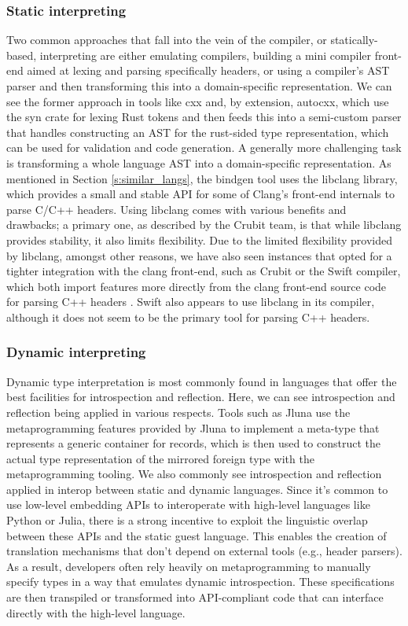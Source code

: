 \subsubsection{Static interpreting}

Two common approaches that fall into the vein of the compiler, or statically-based, interpreting are either emulating compilers, \ie building a mini compiler front-end aimed at lexing and parsing specifically headers, or using a compiler's AST parser and then transforming this into a domain-specific representation. We can see the former approach in tools like cxx and, by extension, autocxx, which use the syn crate \cite{dtolnay_syn} for lexing Rust tokens and then feeds this into a semi-custom parser that handles constructing an AST for the rust-sided type representation, which can be used for validation and code generation. A generally more challenging task is transforming a whole language AST into a domain-specific representation. As mentioned in Section \ref{s:similar_langs}, the bindgen tool uses the libclang library, which provides a small and stable API for some of Clang's front-end internals to parse C/C++ headers. Using libclang comes with various benefits and drawbacks; a primary one, as described by the Crubit team, is that while libclang provides stability, it also limits flexibility. Due to the limited flexibility provided by libclang, amongst other reasons, we have also seen instances that opted for a tighter integration with the clang front-end, such as Crubit or the Swift compiler, which both import features more directly from the clang front-end source code for parsing C++ headers \cite{zhdan2024swiftcpp}. Swift also appears to use libclang in its compiler, although it does not seem to be the primary tool for parsing C++ headers.      

\subsubsection{Dynamic interpreting}

Dynamic type interpretation is most commonly found in languages that offer the best facilities for introspection and reflection. Here, we can see introspection and reflection being applied in various respects. Tools such as Jluna use the metaprogramming features provided by Jluna to implement a meta-type that represents a generic container for records, which is then used to construct the actual type representation of the mirrored foreign type with the metaprogramming tooling. We also commonly see introspection and reflection applied in interop between static and dynamic languages. Since it's common to use low-level embedding APIs to interoperate with high-level languages like Python or Julia, there is a strong incentive to exploit the linguistic overlap between these APIs and the static guest language. This enables the creation of translation mechanisms that don't depend on external tools (e.g., header parsers). As a result, developers often rely heavily on metaprogramming to manually specify types in a way that emulates dynamic introspection. These specifications are then transpiled or transformed into API-compliant code that can interface directly with the high-level language.

